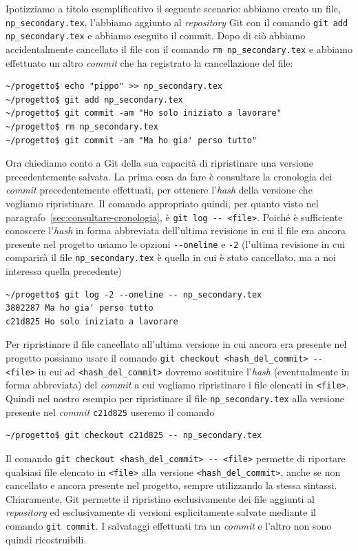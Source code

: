 \documentclass[a4paper,12pt,oneside]{article}
\begin{document}
Ipotizziamo a titolo esemplificativo il seguente scenario: abbiamo creato un
file, \lstinline|np_secondary.tex|, l'abbiamo aggiunto al \emph{repository} Git
con il comando \lstinline|git add np_secondary.tex| e abbiamo eseguito il
commit. Dopo di ciò abbiamo accidentalmente cancellato il file con il comando
\lstinline|rm np_secondary.tex| e abbiamo effettuato un altro \emph{commit}
che ha registrato la cancellazione del file:
\begin{lstlisting}
~/progetto$ echo "pippo" >> np_secondary.tex
~/progetto$ git add np_secondary.tex
~/progetto$ git commit -am "Ho solo iniziato a lavorare"
~/progetto$ rm np_secondary.tex
~/progetto$ git commit -am "Ma ho gia' perso tutto"
\end{lstlisting}
Ora chiediamo conto a Git della sua capacità di ripristinare una versione
precedentemente salvata. La prima cosa da fare è consultare la cronologia dei
\emph{commit} precedentemente effettuati, per ottenere l'\emph{hash} della
versione che vogliamo ripristinare. Il comando appropriato quindi, per quanto
visto nel paragrafo~\ref{sec:consultare-cronologia}, è
\lstinline|git log -- <file>|. Poiché è sufficiente conoscere l'\emph{hash} in
forma abbreviata dell'ultima revisione in cui il file era ancora presente nel
progetto usiamo le opzioni \lstinline|--oneline| e \lstinline|-2| (l'ultima
revisione in cui comparirà il file \lstinline|np_secondary.tex| è quella in cui
è stato cancellato, ma a noi interessa quella precedente)
\begin{lstlisting}
~/progetto$ git log -2 --oneline -- np_secondary.tex
3802287 Ma ho gia' perso tutto
c21d825 Ho solo iniziato a lavorare
\end{lstlisting}
Per ripristinare il file cancellato all'ultima versione in cui ancora era
presente nel progetto possiamo usare il comando
\lstinline|git checkout <hash_del_commit> -- <file>| in cui ad
\lstinline|<hash_del_commit>| dovremo sostituire l'\emph{hash} (eventualmente in
forma abbreviata) del \emph{commit} a cui vogliamo ripristinare i file elencati
in \lstinline|<file>|. Quindi nel nostro esempio per ripristinare il file
\lstinline|np_secondary.tex| alla versione presente nel \emph{commit}
\lstinline|c21d825| useremo il comando
\begin{lstlisting}
~/progetto$ git checkout c21d825 -- np_secondary.tex
\end{lstlisting}

Il comando \lstinline|git checkout <hash_del_commit> -- <file>| permette di
riportare qualsiasi file elencato in \lstinline|<file>| alla versione
\lstinline|<hash_del_commit>|, anche se non cancellato e ancora presente nel
progetto, sempre utilizzando la stessa sintassi. Chiaramente, Git permette il
ripristino esclusivamente dei file aggiunti al \emph{repository} ed
esclusivamente di versioni esplicitamente salvate mediante il comando
\lstinline|git commit|. I salvataggi effettuati tra un \emph{commit} e l'altro
non sono quindi ricostruibili.
\end{document}
